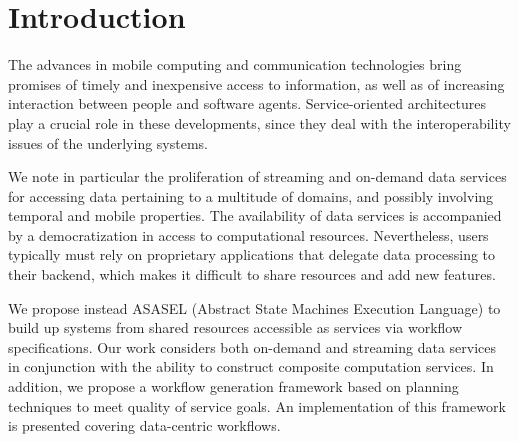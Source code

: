 	
\section{Introduction}\label{sec:asasel:intro}

The advances in mobile computing and communication technologies bring promises of timely and inexpensive access to information, as well as of increasing interaction between people and software agents. Service-oriented architectures play a crucial role in these developments, since they  deal with the interoperability issues of the underlying systems.

We note in particular the proliferation of streaming and on-demand data services for accessing data pertaining to a multitude of domains, and possibly involving temporal and mobile properties. The availability of data services is accompanied by a democratization in access to computational resources. Nevertheless, users typically must rely on proprietary applications that delegate data processing to their backend, which makes it difficult to share resources and add new features.	
	
We propose instead ASASEL (Abstract State Machines Execution Language) to build up systems from shared resources accessible as services via workflow specifications. Our work considers both on-demand and streaming data services in conjunction with the ability to construct composite computation services. 
In addition, we propose a workflow generation framework based on planning techniques to meet quality of service goals. An implementation of this framework is presented covering data-centric workflows.
